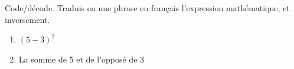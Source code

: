 %
%
    Code/décode. Traduis en une phrase en français l'expression mathématique, et inversement.
    \begin{enumerate}
        \item \((5-3)^2\)
        \item La somme de 5 et de l'opposé de 3
    \end{enumerate}
